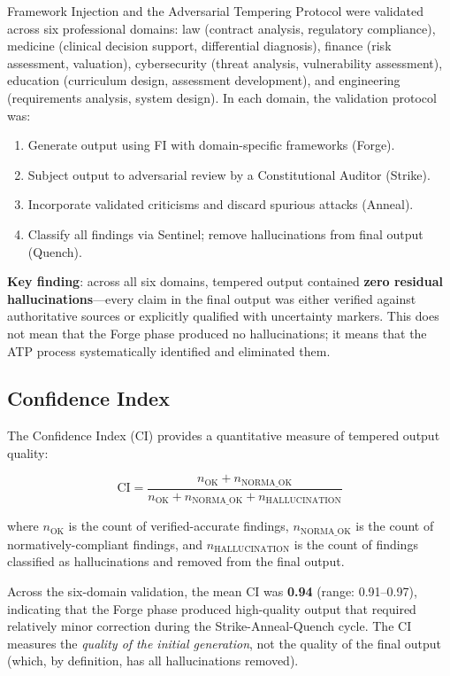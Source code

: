 \documentclass[12pt,a4paper]{article}
\begin{document}
Framework Injection and the Adversarial Tempering Protocol were validated across six professional domains: law (contract analysis, regulatory compliance), medicine (clinical decision support, differential diagnosis), finance (risk assessment, valuation), cybersecurity (threat analysis, vulnerability assessment), education (curriculum design, assessment development), and engineering (requirements analysis, system design). In each domain, the validation protocol was:

\begin{enumerate}
  \item Generate output using FI with domain-specific frameworks (Forge).
  \item Subject output to adversarial review by a Constitutional Auditor (Strike).
  \item Incorporate validated criticisms and discard spurious attacks (Anneal).
  \item Classify all findings via Sentinel; remove hallucinations from final output (Quench).
\end{enumerate}

\textbf{Key finding}: across all six domains, tempered output contained \textbf{zero residual hallucinations}---every claim in the final output was either verified against authoritative sources or explicitly qualified with uncertainty markers. This does not mean that the Forge phase produced no hallucinations; it means that the ATP process systematically identified and eliminated them.

\subsection{Confidence Index}

The Confidence Index (CI) provides a quantitative measure of tempered output quality:

\begin{equation}
\text{CI} = \frac{n_{\text{OK}} + n_{\text{NORMA\_OK}}}{n_{\text{OK}} + n_{\text{NORMA\_OK}} + n_{\text{HALLUCINATION}}}
\label{eq:ci}
\end{equation}

where $n_{\text{OK}}$ is the count of verified-accurate findings, $n_{\text{NORMA\_OK}}$ is the count of normatively-compliant findings, and $n_{\text{HALLUCINATION}}$ is the count of findings classified as hallucinations and removed from the final output.

Across the six-domain validation, the mean CI was \textbf{0.94} (range: 0.91--0.97), indicating that the Forge phase produced high-quality output that required relatively minor correction during the Strike-Anneal-Quench cycle. The CI measures the \emph{quality of the initial generation}, not the quality of the final output (which, by definition, has all hallucinations removed).
\end{document}
